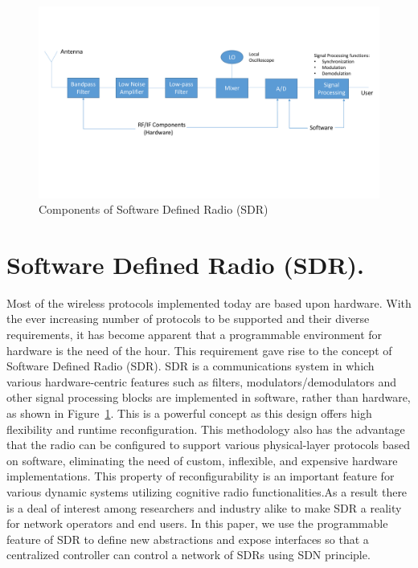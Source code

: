 \begin{figure}[t]
  \centering
  \includegraphics[width=1\textwidth]{figures/SDR.pdf}
  \caption{Components of Software Defined Radio (SDR)}
  \label{fig:SDR}
\end{figure}
\section{Software Defined Radio (SDR).}
Most of the wireless protocols implemented today are based upon hardware. With the ever increasing number of protocols to be supported and their diverse requirements, it has become apparent that a programmable environment for hardware is the need of the hour. This requirement gave rise to the concept of Software Defined Radio (SDR). SDR is a communications system in which various hardware-centric features such as filters, modulators/demodulators and other signal processing blocks are implemented in software, rather than hardware, as shown in Figure~\ref{fig:SDR}. This is a powerful concept as this design offers high flexibility and runtime reconfiguration. This methodology also has the advantage that the radio can be configured to support various physical-layer protocols based on software, eliminating the need of custom, inflexible, and expensive hardware implementations. This property of reconfigurability is an important feature for various dynamic systems utilizing cognitive radio functionalities.As a result there is a deal of interest among researchers and industry alike to make SDR a reality for network operators and end users. In this paper, we use the programmable feature of SDR to define new abstractions and expose interfaces so that a centralized controller can control a network of SDRs using SDN principle. 

